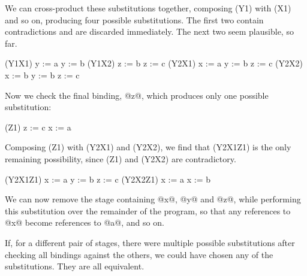 We can cross-product these substitutions together, composing (Y1) with (X1) and so on, producing four possible substitutions.
The first two contain contradictions and are discarded immediately.
The next two seem plausible, so far.
\begin{code}
(Y1X1)
y := a
y := b
(Y1X2)
z := b
z := c
(Y2X1)
x := a
y := b
z := c
(Y2X2)
x := b
y := b
z := c
\end{code}

Now we check the final binding, @z@, which produces only one possible substitution:
\begin{code}
(Z1)
z := c
x := a
\end{code}

Composing (Z1) with (Y2X1) and (Y2X2), we find that (Y2X1Z1) is the only remaining possibility, since (Z1) and (Y2X2) are contradictory.
\begin{code}
(Y2X1Z1)
x := a
y := b
z := c
(Y2X2Z1)
x := a
x := b
\end{code}

We can now remove the stage containing @x@, @y@ and @z@, while performing this substitution over the remainder of the program, so that any references to @x@ become references to @a@, and so on.

If, for a different pair of stages, there were multiple possible substitutions after checking all bindings against the others, we could have chosen any of the substitutions.
They are all equivalent.




